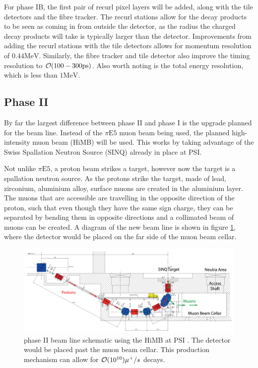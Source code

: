 For phase IB, the first pair of recurl pixel layers will be added, along with the tile detectors and the fibre tracker.
The recurl stations allow for the decay products to be seen as coming in from outside the detector, as the radius the charged decay products will take is typically larger than the detector.
Improvements from adding the recurl stations with the tile detectors allows for momentum resolution of $0.44\textrm{MeV}$.
Similarly, the fibre tracker and tile detector also improve the timing resolution to $\operatorname{\mathcal{O}}(100-300\textrm{ps})$. 
Also worth noting is the total energy resolution, which is less than $1\textrm{MeV}$.

\subsection{Phase II}
By far the largest difference between phase II and phase I is the upgrade planned for the beam line.
Instead of the $\pi\textrm{E5}$ muon beam being used, the planned high-intensity muon beam (HiMB) will be used.
This works by taking advantage of the Swiss Spallation Neutron Source (SINQ) already in place at PSI.

Not unlike $\pi\textrm{E5}$, a proton beam strikes a target, however now the target is a spallation neutron source.
As the protons strike the target, made of lead, zirconium, aluminium alloy, surface muons are created in the aluminium layer.
The muons that are accessible are travelling in the opposite direction of the proton, such that even though they have the same sign charge, they can be separated by bending them in opposite directions and a collimated beam of muons can be created.
A diagram of the new beam line is shown in figure \ref{fig:mu3e_phaseII_schematic}, where the \mueee detector would be placed on the far side of the muon beam cellar.

\begin{figure}[h]
    \centering
    \includegraphics[width = \textwidth]{Figures/experiments/mu3e_phase2_schematic.png}
    \caption{\mueee phase II beam line schematic using the HiMB at PSI \cite{Blondel:2013ia}.
    The \mueee detector would be placed past the muon beam cellar.
    This production mechanism can allow for $\operatorname{\mathcal{O}}(10^{10})\mu^+/s$ decays.}
    \label{fig:mu3e_phaseII_schematic}
\end{figure}

